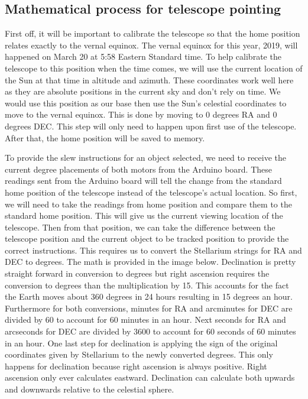 \documentclass[12pt]{report}
\begin{document}
\subsection*{Mathematical process for telescope pointing}

First off, it will be important to calibrate the telescope so that the home position relates exactly to the vernal equinox. The vernal equinox for this year, 2019, will happened on March 20 at 5:58 Eastern Standard time. To help calibrate the telescope to this position when the time comes, we will use the current location of the Sun at that time in altitude and azimuth. These coordinates work well here as they are absolute positions in the current sky and don’t rely on time. We would use this position as our base then use the Sun’s celestial coordinates to move to the vernal equinox. This is done by moving to 0 degrees RA and 0 degrees DEC. This step will only need to happen upon first use of the telescope. After that, the home position will be saved to memory.

To provide the slew instructions for an object selected, we need to receive the current degree placements of both motors from the Arduino board. These readings sent from the Arduino board will tell the change from the standard home position of the telescope instead of the telescope’s actual location. So first, we will need to take the readings from home position and compare them to the standard home position. This will give us the current viewing location of the telescope. Then from that position, we can take the difference between the telescope position and the current object to be tracked position to provide the correct instructions. This requires us to convert the Stellarium strings for RA and DEC to degrees. The math is provided in the image below. Declination is pretty straight forward in conversion to degrees but right ascension requires the conversion to degrees than the multiplication by 15. This accounts for the fact the Earth moves about 360 degrees in 24 hours resulting in 15 degrees an hour. Furthermore for both conversions, minutes for RA and arcminutes for DEC are divided by 60 to account for 60 minutes in an hour. Next seconds  for RA and arcseconds for DEC are divided by 3600 to account for 60 seconds of 60 minutes in an hour. One last step for declination is applying the sign of the original coordinates given by Stellarium to the newly converted degrees. This only happens for declination because right ascension is always positive. Right ascension only ever calculates eastward. Declination can calculate both upwards and downwards relative to the celestial sphere.
\end{document}
